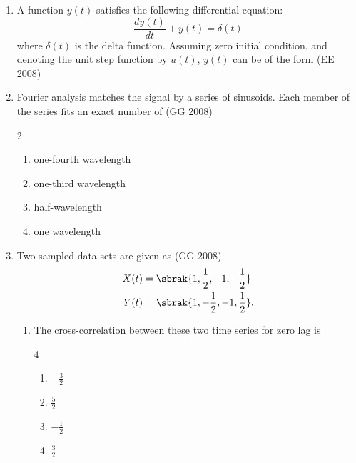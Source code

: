 \begin{enumerate}[label=\thesubsection.\arabic*,ref=\thesubsection.\theenumi]
\begin{enumerate}
\end{enumerate}
\item A function $y(t)$ satisfies the following differential equation:
\[
\frac{dy(t)}{dt} + y(t) = \delta(t)
\]
where $\delta(t)$ is the delta function. Assuming zero initial condition, and denoting the unit step function by $u(t)$, $y(t)$ can be of the form
\hfill (EE 2008)
\begin{enumerate}
\end{enumerate}
%
    \item Fourier analysis matches the signal by a series of sinusoids. Each member of the series fits an exact number of
    \hfill{(GG 2008)}
    \begin{multicols}{2}
        \begin{enumerate}
            \item one-fourth wavelength
            \item one-third wavelength
            \item half-wavelength
            \item one wavelength
        \end{enumerate}
    \end{multicols}
    \item  Two sampled data sets are given as 
    \hfill{(GG 2008)}
	    \begin{align*}
		    X(t) &= \sbrak{1, \frac{1}{2}, -1, -\frac{1}{2}}
	    \\
	    Y(t) &= \sbrak{1, -\frac{1}{2}, -1, \frac{1}{2}}.
    \end{align*}
        \begin{enumerate}
    \item The cross-correlation between these two time series for zero lag is
    
    \begin{multicols}{4}
        \begin{enumerate}
            \item $-\frac{3}{2}$
            \item $\frac{5}{2}$
            \item $-\frac{1}{2}$
            \item $\frac{3}{2}$
        \end{enumerate}
    \end{multicols}


\end{enumerate}
\end{enumerate}
